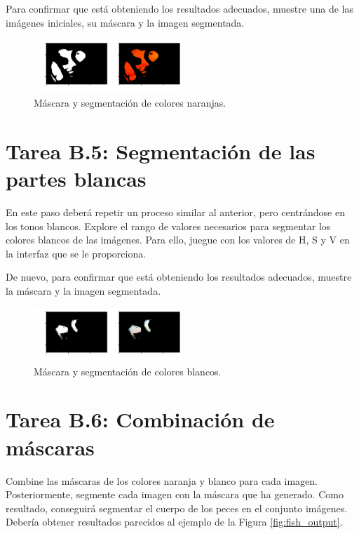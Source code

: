 Para confirmar que está obteniendo los resultados adecuados, muestre una de las imágenes iniciales, su máscara y la imagen segmentada.


\begin{figure}[h]
    \centering
    \includegraphics[width=0.5\textwidth]{Lab_1/template/figures/orange.png}
    \caption{Máscara y segmentación de colores naranjas.}
    \label{fig:orange_mask}
\end{figure}

\section*{Tarea B.5: Segmentación de las partes blancas}

En este paso deberá repetir un proceso similar al anterior, pero centrándose en los tonos blancos. Explore el rango de valores necesarios para segmentar los colores blancos de las imágenes. Para ello, juegue con los valores de H, S y V en la interfaz que se le proporciona.

De nuevo, para confirmar que está obteniendo los resultados adecuados, muestre la máscara y la imagen segmentada.

\begin{figure}[h]
    \centering
    \includegraphics[width=0.5\textwidth]{Lab_1/template/figures/white.png}
    \caption{Máscara y segmentación de colores blancos.}
    \label{fig:whithe_mask}
\end{figure}

\section*{Tarea B.6: Combinación de máscaras}

Combine las máscaras de los colores naranja y blanco para cada imagen. Posteriormente, segmente cada imagen con la máscara que ha generado. Como resultado, conseguirá segmentar el cuerpo de los peces en el conjunto imágenes. Debería obtener resultados parecidos al ejemplo de la Figura \ref{fig:fish_output}.

